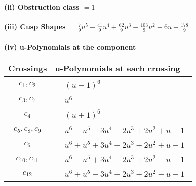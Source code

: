 \documentclass[1p]{elsarticle_modified}
\theoremstyle{definition}
\begin{document}
\flushleft \textbf{(ii) Obstruction class $= 1$}\\~\\
\flushleft \textbf{(iii) Cusp Shapes $= \frac{7}{9} u^5-\frac{41}{9} u^4+\frac{62}{9} u^3-\frac{103}{9} u^2+6 u-\frac{178}{9}$}\\~\\
\newpage\renewcommand{\arraystretch}{1}
\flushleft \textbf{(iv) u-Polynomials at the component}\newline \\
\begin{tabular}{m{50pt}|m{274pt}}
Crossings & \hspace{64pt}u-Polynomials at each crossing \\
\hline $$\begin{aligned}c_{1},c_{2}\end{aligned}$$&$\begin{aligned}
&(u-1)^6
\end{aligned}$\\
\hline $$\begin{aligned}c_{3},c_{7}\end{aligned}$$&$\begin{aligned}
&u^6
\end{aligned}$\\
\hline $$\begin{aligned}c_{4}\end{aligned}$$&$\begin{aligned}
&(u+1)^6
\end{aligned}$\\
\hline $$\begin{aligned}c_{5},c_{8},c_{9}\end{aligned}$$&$\begin{aligned}
&u^6- u^5-3 u^4+2 u^3+2 u^2+u-1
\end{aligned}$\\
\hline $$\begin{aligned}c_{6}\end{aligned}$$&$\begin{aligned}
&u^6+u^5+3 u^4+2 u^3+2 u^2+u-1
\end{aligned}$\\
\hline $$\begin{aligned}c_{10},c_{11}\end{aligned}$$&$\begin{aligned}
&u^6- u^5+3 u^4-2 u^3+2 u^2- u-1
\end{aligned}$\\
\hline $$\begin{aligned}c_{12}\end{aligned}$$&$\begin{aligned}
&u^6+u^5-3 u^4-2 u^3+2 u^2- u-1
\end{aligned}$\\
\hline
\end{tabular}\\~\\
\end{document}
